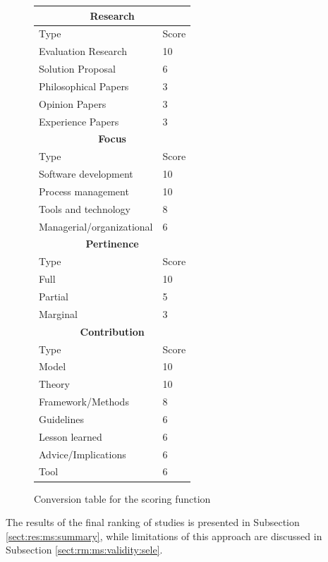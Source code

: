 \documentclass[final,5p,times,twocolumn]{elsarticle}
\begin{document}
\begin{figure}[H]
{\begin{tabular}{|p{1.35in}|p{0.3in}|}
\multicolumn{2}{|c|}{\textbf{Research}} \\ 
\hline 
  
Type &	Score\\
\hline  
Evaluation Research & 10 \\ 
Solution Proposal & 6 \\   
Philosophical Papers & 3 \\ 
Opinion Papers & 3 \\ 
Experience Papers & 3 \\

\hline \hline
\multicolumn{2}{|c|}{\textbf{Focus}} \\
\hline  
  Type & Score\\
\hline
Software development & 10 \\ 
Process management & 10 \\ 
Tools and technology & 8 \\ 
Managerial/organizational & 6 \\ 
\hline \hline

\multicolumn{2}{|c|}{\textbf{Pertinence}} \\
\hline  
  Type & Score\\
\hline

Full  & 10 \\ 
Partial & 5 \\ 
Marginal & 3 \\



\hline \hline
\multicolumn{2}{|c|}{\textbf{Contribution}} \\
\hline 
Type &	Score\\
\hline  
Model & 10 \\  
Theory & 10 \\ 
Framework/Methods & 8 \\  
Guidelines & 6 \\  
Lesson learned & 6 \\   
Advice/Implications & 6 \\    
Tool  &  6 \\

 \hline 
\hline
 \end{tabular}


}
\caption[Optional caption for list of figures]{Conversion table for the scoring function}
\label{fig:ms:score-conversion}
\end{figure}
\small

The results of the final ranking of studies is presented in Subsection \ref{sect:res:ms:summary}, while limitations of this approach are discussed in Subsection \ref{sect:rm:ms:validity:sele}.
\end{document}
